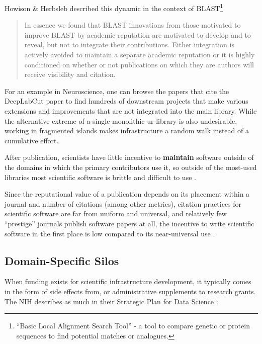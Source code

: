 Howison \& Herbsleb described this dynamic in the context of
BLAST\footnote{``Basic Local Alignment Search Tool'' - a tool to compare
  genetic or protein sequences to find potential matches or analogues.}

\begin{quote}
In essence we found that BLAST innovations from those motivated to
improve BLAST by academic reputation are motivated to develop and to
reveal, but not to integrate their contributions. Either integration is
actively avoided to maintain a separate academic reputation or it is
highly conditioned on whether or not publications on which they are
authors will receive visibility and citation. \citep{howisonIncentivesIntegrationScientific2013} 
\end{quote}

For an example in Neuroscience, one can browse the papers that cite the
DeepLabCut paper \citep{mathisDeepLabCutMarkerlessPose2018}  to
find hundreds of downstream projects that make various extensions and
improvements that are not integrated into the main library. While the
alternative extreme of a single monolithic ur-library is also
undesirable, working in fragmented islands makes infrastructure a random
walk instead of a cumulative effort.

After publication, scientists have little incentive to \textbf{maintain}
software outside of the domains in which the primary contributors use
it, so outside of the most-used libraries most scientific software is
brittle and difficult to use \citep{carverSurveyStatePractice2022, mangulImprovingUsabilityArchival2019, kumarBioinformaticsSoftwareBiologists2007} .

Since the reputational value of a publication depends on its placement
within a journal and number of citations (among other metrics), citation
practices for scientific software are far from uniform and universal,
and relatively few ``prestige'' journals publish software papers at all,
the incentive to write scientific software in the first place is low
compared to its near-universal use \citep{howisonSoftwareScientificLiterature2016} .

\hypertarget{domain-specific-silos}{%
\subsection{Domain-Specific Silos}\label{domain-specific-silos}}

When funding exists for scientific infrastructure development, it
typically comes in the form of side effects from, or administrative
supplements to research grants. The NIH describes as much in their
Strategic Plan for Data Science \citep{NIHStrategicPlan2018} :

